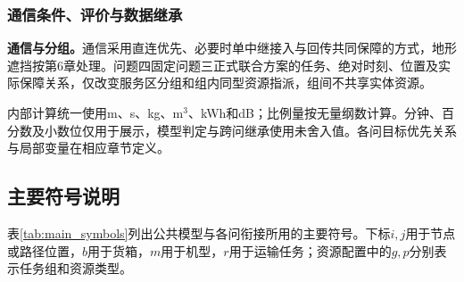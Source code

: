 \subsubsection{通信条件、评价与数据继承}
\noindent\textbf{通信与分组。}通信采用直连优先、必要时单中继接入与回传共同保障的方式，地形遮挡按第6章处理。问题四固定问题三正式联合方案的任务、绝对时刻、位置及实际保障关系，仅改变服务区分组和组内同型资源指派，组间不共享实体资源。

内部计算统一使用m、s、kg、m$^3$、kWh和dB；比例量按无量纲数计算。分钟、百分数及小数位仅用于展示，模型判定与跨问继承使用未舍入值。各问目标优先关系与局部变量在相应章节定义。

\subsection{主要符号说明}

表\ref{tab:main_symbols}列出公共模型与各问衔接所用的主要符号。下标$i,j$用于节点或路径位置，$b$用于货箱，$m$用于机型，$r$用于运输任务；资源配置中的$g,p$分别表示任务组和资源类型。

